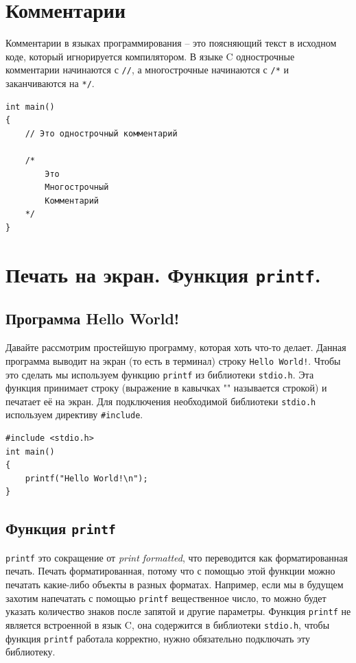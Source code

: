 \documentclass{article}
\begin{document}
\section*{Комментарии}
Комментарии в языках программирования -- это поясняющий текст в исходном коде, который игнорируется компилятором. В языке C однострочные комментарии начинаются с \texttt{//}, а многострочные начинаются с \texttt{/*} и заканчиваются на \texttt{*/}.
\begin{lstlisting}
int main() 
{
    // Это однострочный комментарий
    
    /*
    	Это
    	Многострочный
    	Комментарий
    */
}
\end{lstlisting}




\section*{Печать на экран. Функция \texttt{printf}.}
\subsection*{Программа Hello World!}
Давайте рассмотрим простейшую программу, которая хоть что-то делает. Данная программа выводит на экран (то есть в терминал) строку \texttt{Hello World!}. Чтобы это сделать мы используем функцию \texttt{printf} из библиотеки \texttt{stdio.h}. Эта функция принимает строку (выражение в кавычках "{}"{} называется строкой) и печатает её на экран. Для подключения необходимой библиотеки \texttt{stdio.h} используем директиву \texttt{\#include}.
\begin{lstlisting}
#include <stdio.h>
int main() 
{
    printf("Hello World!\n");
}
\end{lstlisting}


\subsection*{Функция \texttt{printf}}
\texttt{printf} это сокращение от \textit{print formatted}, что переводится как форматированная печать.
Печать форматированная, потому что с помощью этой функции можно печатать какие-либо объекты в разных форматах.
Например, если мы в будущем захотим напечатать с помощью \texttt{printf} вещественное число, то можно будет
указать количество знаков после запятой и другие параметры. Функция \texttt{printf} не является встроенной в язык C, она содержится в библиотеки \texttt{stdio.h}, чтобы функция \texttt{printf} работала корректно, нужно обязательно подключать эту библиотеку.
\end{document}
